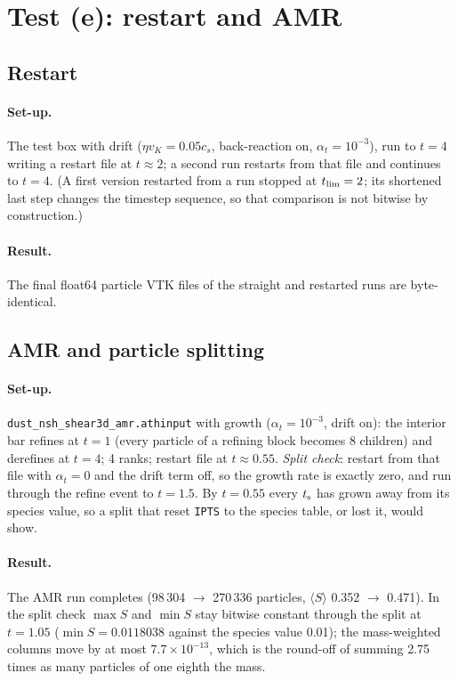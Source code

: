 \documentclass[11pt]{article}
\newcommand{\code}[1]{\texttt{#1}}
\newcommand{\file}[1]{\texttt{\small #1}}
\newcommand{\St}{S}
\newcommand{\ts}{t_{\rm s}}
\begin{document}
\section{Test (e): restart and AMR}

\subsection{Restart}
\paragraph{Set-up.} The test box with drift ($\eta v_K=0.05c_s$, back-reaction on,
$\alpha_t=10^{-3}$), run to $t=4$ writing a restart file at $t\approx2$; a second run
restarts from that file and continues to $t=4$. (A first version restarted from a run
stopped at $t_{\rm lim}=2$; its shortened last step changes the timestep sequence, so
that comparison is not bitwise by construction.)
\paragraph{Result.} The final float64 particle VTK files of the straight and restarted
runs are byte-identical.

\subsection{AMR and particle splitting}
\paragraph{Set-up.} \file{dust\_nsh\_shear3d\_amr.athinput} with growth
($\alpha_t=10^{-3}$, drift on): the interior bar refines at $t=1$ (every particle of a
refining block becomes 8 children) and derefines at $t=4$; 4 ranks; restart file at
$t\approx0.55$. \emph{Split check}: restart from that file with
$\alpha_t=0$ and the drift term off, so the growth rate is exactly zero, and run through
the refine event to $t=1.5$. By $t=0.55$ every $\ts$ has grown away from its species
value, so a split that reset \code{IPTS} to the species table, or lost it, would show.
\paragraph{Result.} The AMR run completes (98\,304 $\to$ 270\,336 particles,
$\langle\St\rangle$ 0.352 $\to$ 0.471). In the split check $\max\St$ and $\min\St$ stay
bitwise constant through the split at $t=1.05$ ($\min\St=0.0118038$ against the species
value 0.01); the mass-weighted columns move by at most $7.7\times10^{-13}$, which is the
round-off of summing 2.75 times as many particles of one eighth the mass.
\end{document}
